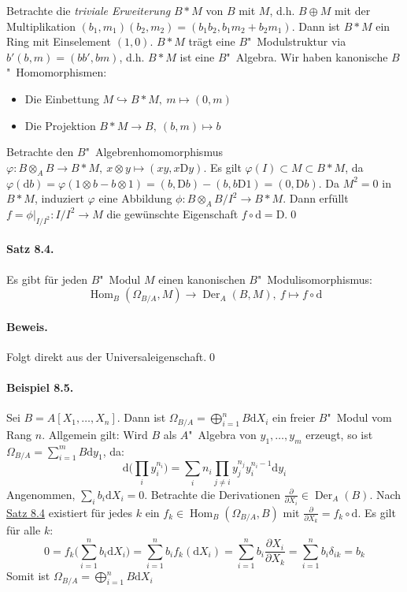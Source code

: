 Betrachte die \textit{triviale Erweiterung} $B\ast M$ von $B$ mit $M$, d.h. $B\oplus M$ mit der Multiplikation $(b_1,m_1)(b_2,m_2)=(b_1b_2,b_1m_2+b_2m_1)$. Dann ist $B\ast M$ ein Ring mit Einselement $(1,0)$. $B\ast M$ trägt eine $B$"~Modulstruktur via $b'(b,m)=(bb',bm)$, d.h. $B\ast M$ ist eine $B$"~Algebra. Wir haben kanonische $B$"~Homomorphismen:
\begin{itemize}
\item Die Einbettung $M\hookrightarrow B\ast M,\ m\mapsto (0,m)$
\item Die Projektion $B\ast M\to B,\ (b,m)\mapsto b$
\end{itemize}
Betrachte den $B$"~Algebrenhomomorphismus $\varphi:B\otimes_AB\to B\ast M,\ x\otimes y\mapsto (xy,x\mathrm{D}y)$. Es gilt $\varphi(I)\subset M\subset B\ast M$, da $\varphi(\mathrm{d}b)=\varphi(1\otimes b- b\otimes 1)=(b,\mathrm{D}b)-(b,b\mathrm{D}1)=(0,\mathrm{D}b)$. Da $M^2=0$ in $B\ast M$, induziert $\varphi$ eine Abbildung $\phi: B\otimes_A B/I^2\to B\ast M$. Dann erfüllt $f=\phi|_{I/I^2}:I/I^2\to M$ die gewünschte Eigenschaft $f\circ\mathrm{d}=\mathrm{D}$.\qed

\paragraph{Satz 8.4.}\label{8.4} Es gibt für jeden $B$"~Modul $M$ einen kanonischen $B$"~Modulisomorphismus:
\[\operatorname{Hom}_B(\Omega_{B/A},M)\to\operatorname{Der}_A(B,M),\ f\mapsto f\circ\mathrm{d} \]

\paragraph{Beweis.} Folgt direkt aus der Universaleigenschaft.\qed

\paragraph{Beispiel 8.5.}\label{8.5} Sei $B=A[X_1,\ldots,X_n]$. Dann ist $\Omega_{B/A}=\bigoplus_{i=1}^n B\mathrm{d}X_i$ ein freier $B$"~Modul vom Rang $n$. Allgemein gilt: Wird $B$ als $A$"~Algebra von $y_1,\ldots,y_m$ erzeugt, so ist $\Omega_{B/A}=\sum_{i=1}^m B\mathrm{d}y_1$, da:
\[\mathrm{d}\Big(\prod_i y_i^{n_i}\Big) = \sum_i n_i\prod_{j\neq i} y_j^{n_j}y_i^{n_i - 1}\mathrm{d}y_i \]
Angenommen, $\sum_i b_i\mathrm{d}X_i=0$. Betrachte die Derivationen $\frac{\partial}{\partial X_i}\in\operatorname{Der}_A(B)$. Nach \hyperref[8.4]{Satz 8.4} existiert für jedes $k$ ein $f_k\in\operatorname{Hom}_B(\Omega_{B/A},B)$ mit $\frac{\partial}{\partial X_k}=f_k\circ\mathrm{d}$. Es gilt für alle $k$:
\[ 0= f_k\Big(\sum_{i=1}^n b_i\mathrm{d}X_i\Big)= \sum_{i=1}^n b_i f_k(\mathrm{d}X_i) = \sum_{i=1}^n b_i \frac{\partial X_i}{\partial X_k} = \sum_{i=1}^n b_i\delta_{ik}=b_k \]
Somit ist $\Omega_{B/A}=\bigoplus_{i=1}^nB\mathrm{d}X_i$

